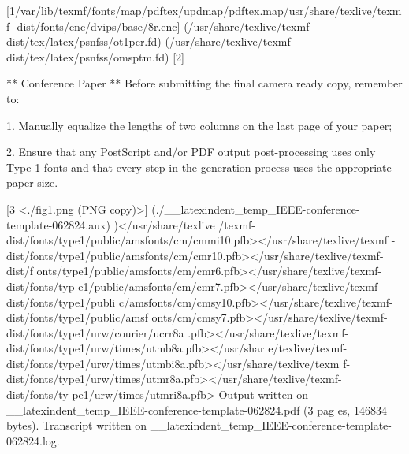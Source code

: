 [1{/var/lib/texmf/fonts/map/pdftex/updmap/pdftex.map}{/usr/share/texlive/texmf-
dist/fonts/enc/dvips/base/8r.enc}]
(/usr/share/texlive/texmf-dist/tex/latex/psnfss/ot1pcr.fd)
(/usr/share/texlive/texmf-dist/tex/latex/psnfss/omsptm.fd)
[2]

** Conference Paper **
Before submitting the final camera ready copy, remember to:

 1. Manually equalize the lengths of two columns on the last page
 of your paper;

 2. Ensure that any PostScript and/or PDF output post-processing
 uses only Type 1 fonts and that every step in the generation
 process uses the appropriate paper size.


[3 <./fig1.png (PNG copy)>]
(./__latexindent_temp_IEEE-conference-template-062824.aux) )</usr/share/texlive
/texmf-dist/fonts/type1/public/amsfonts/cm/cmmi10.pfb></usr/share/texlive/texmf
-dist/fonts/type1/public/amsfonts/cm/cmr10.pfb></usr/share/texlive/texmf-dist/f
onts/type1/public/amsfonts/cm/cmr6.pfb></usr/share/texlive/texmf-dist/fonts/typ
e1/public/amsfonts/cm/cmr7.pfb></usr/share/texlive/texmf-dist/fonts/type1/publi
c/amsfonts/cm/cmsy10.pfb></usr/share/texlive/texmf-dist/fonts/type1/public/amsf
onts/cm/cmsy7.pfb></usr/share/texlive/texmf-dist/fonts/type1/urw/courier/ucrr8a
.pfb></usr/share/texlive/texmf-dist/fonts/type1/urw/times/utmb8a.pfb></usr/shar
e/texlive/texmf-dist/fonts/type1/urw/times/utmbi8a.pfb></usr/share/texlive/texm
f-dist/fonts/type1/urw/times/utmr8a.pfb></usr/share/texlive/texmf-dist/fonts/ty
pe1/urw/times/utmri8a.pfb>
Output written on __latexindent_temp_IEEE-conference-template-062824.pdf (3 pag
es, 146834 bytes).
Transcript written on __latexindent_temp_IEEE-conference-template-062824.log.
